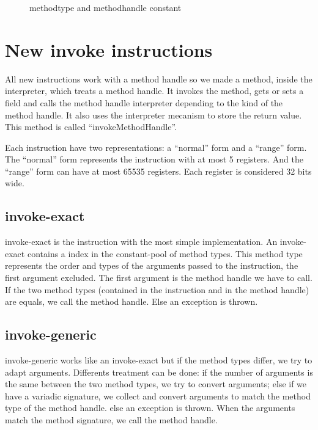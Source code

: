 \documentclass{sig-alternate}
\begin{document}
  \begin{figure}[!h]
    \centering 
    \caption{methodtype and methodhandle constant}
    \label{MTMHldc}
  \end{figure}

\section{New invoke instructions}
  All new instructions work with a method handle so we made a method, inside the interpreter, which treats a method handle.
  It invokes the method, gets or sets a field and calls the method handle interpreter depending to the kind of the method handle.
  It also uses the interpreter mecanism to store the return value.
  This method is called ``invokeMethodHandle''.
  
  Each instruction have two representations: a ``normal'' form and a ``range'' form.
  The ``normal'' form represents the instruction with at most 5 registers.
  And the ``range'' form can have at most 65535 registers.
  Each register is considered 32 bits wide.

  \subsection{invoke-exact}

    invoke-exact is the instruction with the most simple implementation.
    An invoke-exact contains a index in the constant-pool of method types.
    This method type represents the order and types of the arguments passed to the instruction, the first argument excluded.
    The first argument is the method handle we have to call.
    If the two method types (contained in the instruction and in the method handle) are equals, we call the method handle.
    Else an exception is thrown.

  \subsection{invoke-generic}

    invoke-generic works like an invoke-exact but if the method types differ, we try to adapt arguments.
    Differents treatment can be done:
    if the number of arguments is the same between the two method types, we try to convert arguments;
    else if we have a variadic signature, we collect and convert arguments to match the method type of the method handle.
    else an exception is thrown.
    When the arguments match the method signature, we call the method handle.
\end{document}

